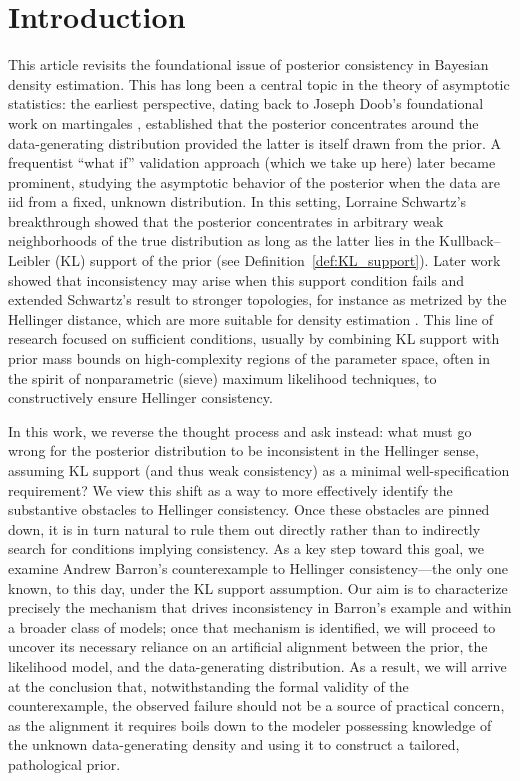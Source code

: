 \documentclass[11pt,twoside]{article}
\begin{document}
\section{Introduction}

This article revisits the foundational issue of posterior consistency in Bayesian density estimation. This has long been a central topic in the theory of asymptotic statistics: the earliest perspective, dating back to Joseph Doob’s foundational work on martingales \cite{doob1949application}, established that the posterior concentrates around the data-generating distribution provided the latter is itself drawn from the prior. A frequentist “what if” validation approach (which we take up here) later became prominent, studying the asymptotic behavior of the posterior when the data are iid from a fixed, unknown distribution. In this setting, Lorraine Schwartz’s breakthrough \cite{schwartz1964consistency} showed that the posterior concentrates in arbitrary weak neighborhoods of the true distribution as long as the latter lies in the Kullback–Leibler (KL) support of the prior (see Definition~\ref{def:KL_support}). Later work showed that inconsistency may arise when this support condition fails \cite{diaconis1986consistency,diaconis1986inconsistent} and extended Schwartz’s result to stronger topologies, for instance as metrized by the Hellinger distance, which are more suitable for density estimation \cite{barron1988exponential, ghosal1999posterior, walker2004newapproaches}. This line of research focused on sufficient conditions, usually by combining KL support with prior mass bounds on high-complexity regions of the parameter space, often in the spirit of nonparametric (sieve) maximum likelihood techniques, to constructively ensure Hellinger consistency.

In this work, we reverse the thought process and ask instead: what must go wrong for the posterior distribution to be inconsistent in the Hellinger sense, assuming KL support (and thus weak consistency) as a minimal well-specification requirement? We view this shift as a way to more effectively identify the substantive obstacles to Hellinger consistency. Once these obstacles are pinned down, it is in turn natural to rule them out directly rather than to indirectly search for conditions implying consistency. As a key step toward this goal, we examine Andrew Barron’s counterexample \cite{barron1988exponential, barron1999consistency} to Hellinger consistency---the only one known, to this day, under the KL support assumption. Our aim is to characterize precisely the mechanism that drives inconsistency in Barron's example and within a broader class of models; once that mechanism is identified, we will proceed to uncover its necessary reliance on an artificial alignment between the prior, the likelihood model, and the data-generating distribution. As a result, we will arrive at the conclusion that, notwithstanding the formal validity of the counterexample, the observed failure should not be a source of practical concern, as the alignment it requires boils down to the modeler possessing knowledge of the unknown data-generating density and using it to construct a tailored, pathological prior.
\end{document}
